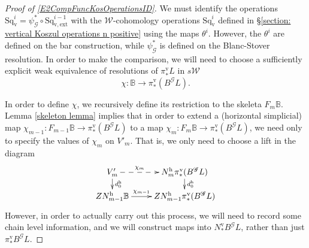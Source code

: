 \documentclass[11pt]{amsart} \renewcommand{\baselinestretch}{1.4}
\theoremstyle{plain}
\theoremstyle{definition}
\DeclareMathOperator{\im}{im}
\renewcommand{\to}{\longrightarrow}
\newcommand{\scrG}{\mathscr{G}}
\newcommand{\calw}{\mathcal{W}}
\newcommand{\citeBOX}[2][]{\cite[\mbox{#1}]{#2}}
\newcommand{\BSW}{{\scrG}}
\newcommand{\BSWres}{B^\BSW}%
\newcommand{\vExtCohOp}{\mathrm{Sq}_\mathrm{v,ext}}
\newcommand{\Id}{\mathrm{id}}
\newcommand{\uver}{^\mathrm{v}}
\newcommand{\uhor}{^\mathrm{h}}
\newcommand{\dver}{_\mathrm{v}}
\newcommand{\Sqv}{\mathrm{Sq}\dver}
\begin{document}
\begin{Operations in composite functor spectral sequences}
\begin{proof}[Proof of \ref{E2CompFuncKosOperationsID}]
We must identify the operations $\Sqv^i=\psi_\BSW^*\circ\vExtCohOp^{i-1}$ with the $\calw$-cohomology operations $\Sqv^i$ defined in \S\ref{section: vertical Koszul operations n positive} using the maps $\theta^i$. However, the $\theta^i$ are defined on the bar construction, while $\psi_\BSW^*$ is defined on the Blanc-Stover resolution. In order to make the comparison, we will need to choose a sufficiently explicit weak equivalence of resolutions of $\pi\uver_* L$ in $s\calw$
\[\chi:\mathbb{B}\to \pi\uver_*(\BSWres L).\]




In order to define $\chi$, we recursively define its restriction to the skeleta $F_m\mathbb{B}$. Lemma \ref{skeleton lemma} implies that in order to extend a (horizontal simplicial) map $\chi_{m-1}:F_{m-1}\mathbb{B}\to \pi\uver_*(\BSWres L)$ to a map $\chi_m:F_m\mathbb{B}\to \pi\uver_*(\BSWres L)$, we need only to specify the values of $\chi_m$ on $V'_m$. That is, we only need to choose a lift in the diagram
\[\xymatrix@R=4mm{
V'_m\ar@{-->}[r]^-{\chi_m}
\ar[d]^-{d\uhor_0}
&%
N\uhor_m\pi\uver_*(\BSWres L)\ar[d]^-{d\uhor_0}
\\%
ZN\uhor_{m-1}\mathbb{B}\ar[r]^-{\chi_{m-1}}
&%
ZN\uhor_{m-1}\pi\uver_*(\BSWres L)%
}\]
However, in order to actually carry out this process, we will need to record some chain level information, and we will  construct maps into $N\uver_*B^{\BSW}L$, rather than just $\pi\uver_*B^{\BSW}L$. 


\end{proof}
\end{Operations in composite functor spectral sequences}
\end{document}
